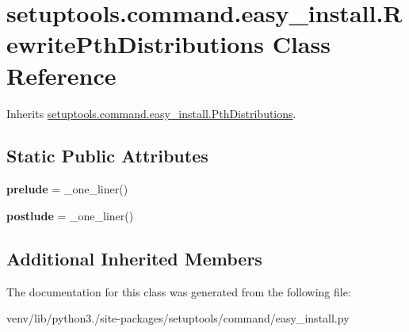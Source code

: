 \hypertarget{classsetuptools_1_1command_1_1easy__install_1_1_rewrite_pth_distributions}{}\section{setuptools.\+command.\+easy\+\_\+install.\+Rewrite\+Pth\+Distributions Class Reference}
\label{classsetuptools_1_1command_1_1easy__install_1_1_rewrite_pth_distributions}


Inherits \hyperlink{classsetuptools_1_1command_1_1easy__install_1_1_pth_distributions}{setuptools.\+command.\+easy\+\_\+install.\+Pth\+Distributions}.

\subsection*{Static Public Attributes}
\begin{DoxyCompactItemize}
\item 
\mbox{\label{classsetuptools_1_1command_1_1easy__install_1_1_rewrite_pth_distributions_ad1ffbf540c109cc88d058bb5c60d430c}} 
{\bfseries prelude} = \+\_\+one\+\_\+liner()
\item 
\mbox{\label{classsetuptools_1_1command_1_1easy__install_1_1_rewrite_pth_distributions_a943b2162a2c74a485ec67d178737d045}} 
{\bfseries postlude} = \+\_\+one\+\_\+liner()
\end{DoxyCompactItemize}
\subsection*{Additional Inherited Members}


The documentation for this class was generated from the following file\+:\begin{DoxyCompactItemize}
\item 
venv/lib/python3./site-\/packages/setuptools/command/easy\+\_\+install.\+py\end{DoxyCompactItemize}
